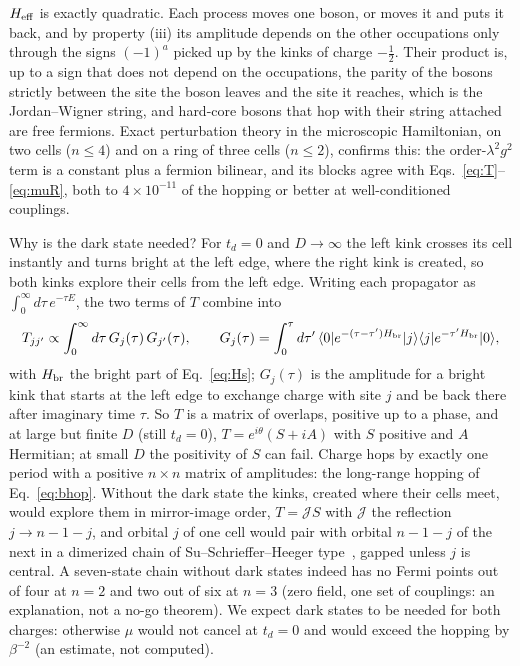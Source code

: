 \documentclass[11pt]{article}
\newcommand{\ket}[1]{|#1\rangle}
\newcommand{\bra}[1]{\langle #1|}
\begin{document}
$H_{\rm eff}$ is exactly quadratic. Each process moves one boson, or moves it and puts it back, and by property (iii) its amplitude depends on the other occupations only through the signs $(-1)^a$ picked up by the kinks of charge $-\tfrac12$. Their product is, up to a sign that does not depend on the occupations, the parity of the bosons strictly between the site the boson leaves and the site it reaches, which is the Jordan--Wigner string, and hard-core bosons that hop with their string attached are free fermions. Exact perturbation theory in the microscopic Hamiltonian, on two cells ($n\le4$) and on a ring of three cells ($n\le2$), confirms this: the order-$\lambda^2g^2$ term is a constant plus a fermion bilinear, and its blocks agree with Eqs.~\eqref{eq:T}--\eqref{eq:muR}, both to $4\times10^{-11}$ of the hopping or better at well-conditioned couplings. %

Why is the dark state needed? For $t_d=0$ and $D\to\infty$ the left kink crosses its cell instantly and turns bright at the left edge, where the right kink is created, so both kinks explore their cells from the left edge. Writing each propagator as $\int_0^\infty d\tau\,e^{-\tau E}$, the two terms of $T$ combine into
\begin{equation}
T_{jj'}\propto\int_0^\infty d\tau\,G_j(\tau)\,G_{j'}(\tau),\qquad
G_j(\tau)=\int_0^\tau d\tau'\,\bra0e^{-(\tau-\tau')H_{\rm br}}\ket j\bra j e^{-\tau'H_{\rm br}}\ket0,
\label{eq:gram}
\end{equation}
with $H_{\rm br}$ the bright part of Eq.~\eqref{eq:Hs}; $G_j(\tau)$ is the amplitude for a bright kink that starts at the left edge to exchange charge with site $j$ and be back there after imaginary time $\tau$. So $T$ is a matrix of overlaps, positive up to a phase, and at large but finite $D$ (still $t_d=0$), $T=e^{i\theta}(S+iA)$ with $S$ positive and $A$ Hermitian; at small $D$ the positivity of $S$ can fail. Charge hops by exactly one period with a positive $n\times n$ matrix of amplitudes: the long-range hopping of Eq.~\eqref{eq:bhop}. Without the dark state the kinks, created where their cells meet, would explore them in mirror-image order, $T=\mathcal JS$ with $\mathcal J$ the reflection $j\to n-1-j$, and orbital $j$ of one cell would pair with orbital $n-1-j$ of the next in a dimerized chain of Su--Schrieffer--Heeger type~\cite{SSH}, gapped unless $j$ is central. A seven-state chain without dark states indeed has no Fermi points out of four at $n=2$ and two out of six at $n=3$ (zero field, one set of couplings: an explanation, not a no-go theorem). We expect dark states to be needed for both charges: otherwise $\mu$ would not cancel at $t_d=0$ and would exceed the hopping by $\beta^{-2}$ (an estimate, not computed). %
\end{document}
